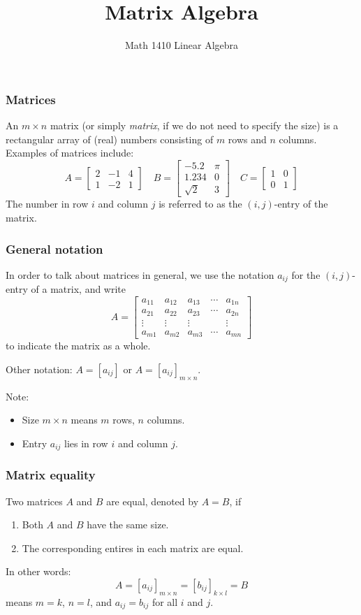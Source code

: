\documentclass[12pt,t]{beamer}
\date{}
\author{Math 1410 Linear Algebra}
\title{Matrix Algebra}
\begin{document}
\begin{frame}
\titlepage
\end{frame}
\begin{frame}\frametitle{Matrices}
 An \alert{$m\times n$ matrix} (or simply {\em matrix}, if we do not need to specify the size) is a rectangular array of (real) numbers consisting of $m$ rows and $n$ columns. Examples of matrices include:
\[
 A = \begin{bmatrix}2&-1&4\\1&-2&1\end{bmatrix}\quad B = \begin{bmatrix} -5.2 & \pi\\1.234& 0\\\sqrt{2}& 3\end{bmatrix}\quad C = \begin{bmatrix}1 & 0 \\0& 1\end{bmatrix}
\]
The number in row $i$ and column $j$ is referred to as the \alert{$(i,j)$-entry} of the matrix.
\end{frame}
\begin{frame}\frametitle{General notation}
 In order to talk about matrices in general, we use the notation $a_{ij}$ for the $(i,j)$-entry of a matrix, and write
\[
 A = \begin{bmatrix}a_{11}& a_{12} & a_{13} & \cdots & a_{1n}\\
      a_{21}  & a_{22} & a_{23} & \cdots & a_{2n}\\
      \vdots & \vdots & \vdots & & \vdots\\
      a_{m1} & a_{m2} & a_{m3} &\cdots & a_{mn}
     \end{bmatrix}
\]
to indicate the matrix as a whole.

\bigskip

Other notation: $A = [a_{ij}]$ or $A=[a_{ij}]_{m\times n}$.

Note: 
\begin{itemize}
 \item Size $m\times n$ means $m$ rows, $n$ columns.
 \item Entry $a_{ij}$ lies in row $i$ and column $j$.
\end{itemize}

\end{frame}
\begin{frame}\frametitle{Matrix equality}
 \begin{definition}
  Two matrices $A$ and $B$ are \alert{equal}, denoted by $A=B$, if
\begin{enumerate}
 \item Both $A$ and $B$ have the same size.
 \item The corresponding entires in each matrix are equal.
\end{enumerate}
\end{definition}
In other words:
\[
 A = [a_{ij}]_{m\times n} = [b_{ij}]_{k\times l} = B
\]
means $m=k$, $n=l$, and $a_{ij} = b_{ij}$ for all $i$ and $j$.
\end{frame}
\end{document}
